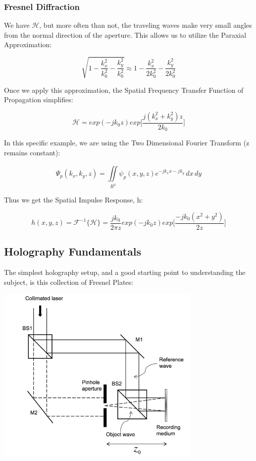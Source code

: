 \documentclass[12pt]{article}
\begin{document}
\subsubsection{Fresnel Diffraction}

We have \(\mathscr{H}\), but more often than not, the traveling waves make very small angles from the normal direction of the aperture. This allows us to utilize the Paraxial Approximation:

\begin{equation}
	\sqrt{1 - \frac{k_{x}^2}{k_{0}^2} - \frac{k_{y}^2}{k_0^2}} \approx 1 - \frac{k_{x}^2}{2k_{0}^2} - \frac{k_{y}^2}{2k_{0}^2}
\end{equation}

Once we apply this approximation, the Spatial Frequency Transfer Function of Propagation simplifies:

\begin{equation}
	\mathscr{H} = exp(-jk_{0}z)exp\bigg[\frac{j(k_{x}^2 + k_{y}^2)z}{2k_{0}}\bigg]
\end{equation}

In this specific example, we are using the Two Dimensional Fourier Transform (z remains constant):

\begin{equation}
	\Psi_{p}(k_{x},k_{y},z) = \iint \limits_{R^2}^{} \psi_{p}(x,y,z)e^{-jk_{x}x - jk_{y}} \,dx\,dy
\end{equation}

Thus we get the Spatial Impulse Response, h:

\begin{equation}
	h(x,y,z) = \mathscr{F}^{-1}\{\mathscr{H}\} = \frac{jk_{0}}{2\pi z} exp(-jk_{0}z)exp\bigg[\frac{-jk_{0}(x^2 + y^2)}{2z}\bigg]
\end{equation}

\subsection{Holography Fundamentals}

The simplest holography setup, and a good starting point to understanding the subject, is this collection of Fresnel Plates:

\begin{center}
	\includegraphics[width=100mm]{tupac7.png}
\end{center}
\end{document}
